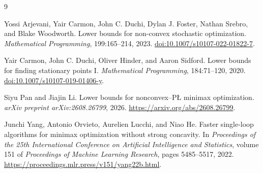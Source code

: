 \documentclass[11pt,a4paper]{article}
\theoremstyle{definition}
\theoremstyle{remark}
\numberwithin{equation}{section}
\begin{document}
\begin{thebibliography}{9}

Yossi Arjevani, Yair Carmon, John C. Duchi, Dylan J. Foster,
Nathan Srebro, and Blake Woodworth.
Lower bounds for non-convex stochastic optimization.
\emph{Mathematical Programming}, 199:165--214, 2023.
\href{https://doi.org/10.1007/s10107-022-01822-7}{doi:10.1007/s10107-022-01822-7}.

Yair Carmon, John C. Duchi, Oliver Hinder, and Aaron Sidford.
Lower bounds for finding stationary points I.
\emph{Mathematical Programming}, 184:71--120, 2020.
\href{https://doi.org/10.1007/s10107-019-01406-y}{doi:10.1007/s10107-019-01406-y}.

Siyu Pan and Jiajin Li.
Lower bounds for nonconvex--P\L{} minimax optimization.
\emph{arXiv preprint arXiv:2608.26799}, 2026.
\url{https://arxiv.org/abs/2608.26799}.

Junchi Yang, Antonio Orvieto, Aurelien Lucchi, and Niao He.
Faster single-loop algorithms for minimax optimization without strong concavity.
In \emph{Proceedings of the 25th International Conference on Artificial
Intelligence and Statistics}, volume 151 of \emph{Proceedings of Machine
Learning Research}, pages 5485--5517, 2022.
\url{https://proceedings.mlr.press/v151/yang22b.html}.

\end{thebibliography}
\end{document}
